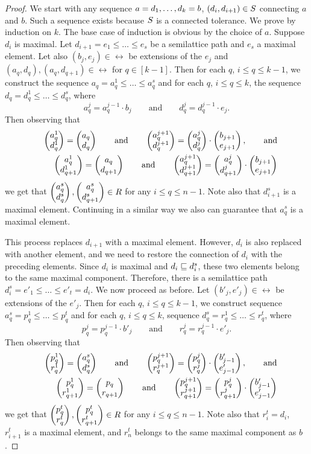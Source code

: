 \documentclass[11pt]{article}
\begin{document}
\begin{proof}
We start with any sequence $a=d_1,\ldots, d_k=b$, $(d_i,d_{i+1})\in S$
connecting $a$ and $b$. Such a sequence exists because $S$ is a
connected tolerance. We prove by induction on $k$.  
The base case of induction is obvious by the choice
of $a$. Suppose $d_i$ is maximal. Let $d_{i+1}=e_1\le\ldots\le e_{s}$ be
a semilattice path and $e_s$ a maximal element. Let also
$(b_j,e_j)\in\rel$ be extensions of the $e_j$ and
$(a_q,d_q),(a_q,d_{q+1})\in\rel$ for $q\in[k-1]$. Then for each $q$, $i\le
q\le k-1$, we construct the sequence $a_q=a_q^1\le\ldots\le a_q^s$ and for
each $q$, $i\le q\le k$, the sequence $d_q=d_q^1\le\ldots\le d_q^s$, where 
$$
a_q^j=a_q^{j-1}\cdot b_j\qquad\mbox{and}\qquad d_q^j=d_q^{j-1}\cdot e_j.
$$
Then observing that
\begin{eqnarray*}
&& \cl{a_q^1}{d_q^1}=\cl{a_q}{d_q}\qquad\mbox{and}\qquad 
\cl{a_q^{j+1}}{d_q^{j+1}}=\cl{a_q^j}{d_q^j}\cdot\cl{b_{j+1}}{e_{j+1}},
\qquad\mbox{and}\\ 
&& \cl{a_q^1}{d_{q+1}^1}=\cl{a_q}{d_{q+1}}\qquad\mbox{and}\qquad 
\cl{a_q^{j+1}}{d_{q+1}^{j+1}}=\cl{a_q^j}{d_{q+1}^j}\cdot
\cl{b_{j+1}}{e_{j+1}}
\end{eqnarray*}
we get that $\cl{a_q^{s}}{d_q^s},\cl{a_q^{s}}{d_{q+1}^s}\in\rel$ for
any $i\le q\le n-1$. Note also that $d_{i+1}^s$ is a maximal element.
Continuing in a similar way we also can guarantee that $a_q^s$ is a
maximal element. 

This process replaces $d_{i+1}$ with a maximal element. However, $d_i$ is also
replaced with another element, and we need to restore the connection of $d_i$ with 
the preceding elements. Since $d_i$ is maximal and $d_i\sqsubseteq d_i^s$, these two 
elements belong to the same maximal component. Therefore, there is a semilattice path
$d_i^s=e'_1\le\ldots\le e'_t=d_i$. We now proceed as before. Let $(b'_j,e'_j)\in\rel$ be
extensions of the $e'_j$. Then for each $q$, $i\le q\le k-1$, we construct
sequence $a_q^s=p_q^1\le\ldots\le p_q^t$ and for each $q$, $i\le q\le k$,
sequence $d_q^s=r_q^1\le\ldots\le r_q^t$, where 
$$
p_q^j=p_q^{j-1}\cdot b'_j\qquad\mbox{and}\qquad r_q^j=r_q^{j-1}\cdot e'_j.
$$
Then observing that
\begin{eqnarray*}
&& \cl{p_q^1}{r_q^1}=\cl{a_q^s}{d_q^s}\qquad\mbox{and}\qquad 
\cl{p_q^{j+1}}{r_q^{j+1}}=\cl{p_q^j}{r_q^j}\cdot
\cl{b'_{j-1}}{e'_{j-1}}, \qquad\mbox{and}\\ 
&& \cl{p_q^1}{r_{q+1}^1}=\cl{p_q}{r_{q+1}}\qquad\mbox{and}\qquad 
\cl{p_q^{j+1}}{r_{q+1}^{j+1}}=\cl{p_q^j}{r_{q+1}^j}\cdot\cl{b'_{j-1}}{e'_{j-1}} 
\end{eqnarray*}
we get that $\cl{p_q^t}{r_q^t},\cl{p_q^t}{r_{q+1}^t}\in\rel$ for any
$i\le q\le n-1$. Note also that $r_i^t=d_i$, $r_{i+1}^t$ is a maximal
element, and $r_n^t$ belongs to the same maximal component as $b$.  
\end{proof}
\end{document}
